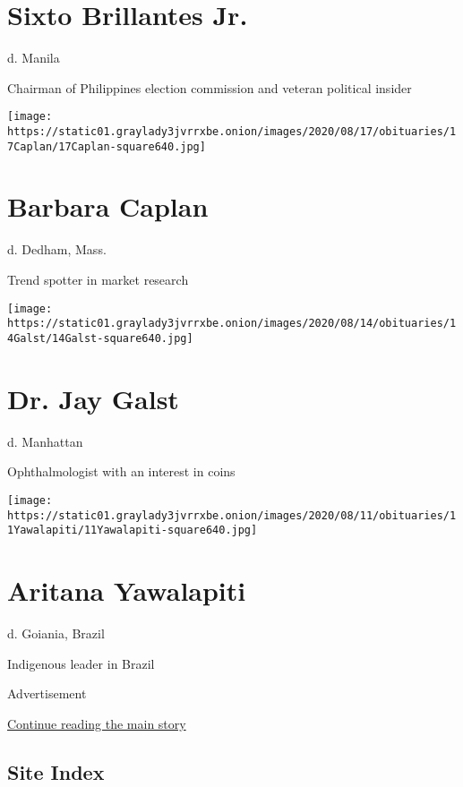\hypertarget{sixto-brillantes-jr}{%
\section{Sixto Brillantes Jr.}\label{sixto-brillantes-jr}}

d. Manila

Chairman of Philippines election commission and veteran political
insider

\texttt{[image: https://static01.graylady3jvrrxbe.onion/images/2020/08/17/obituaries/17Caplan/17Caplan-square640.jpg]}

\hypertarget{barbara-caplan}{%
\section{Barbara Caplan}\label{barbara-caplan}}

d. Dedham, Mass.

Trend spotter in market research

\texttt{[image: https://static01.graylady3jvrrxbe.onion/images/2020/08/14/obituaries/14Galst/14Galst-square640.jpg]}

\hypertarget{dr-jay-galst}{%
\section{Dr. Jay Galst}\label{dr-jay-galst}}

d. Manhattan

Ophthalmologist with an interest in coins

\texttt{[image: https://static01.graylady3jvrrxbe.onion/images/2020/08/11/obituaries/11Yawalapiti/11Yawalapiti-square640.jpg]}

\hypertarget{aritana-yawalapiti}{%
\section{Aritana Yawalapiti}\label{aritana-yawalapiti}}

d. Goiania, Brazil

Indigenous leader in Brazil

Advertisement

\protect\hyperlink{after-bottom}{Continue reading the main story}

\hypertarget{site-index}{%
\subsection{Site Index}\label{site-index}}

